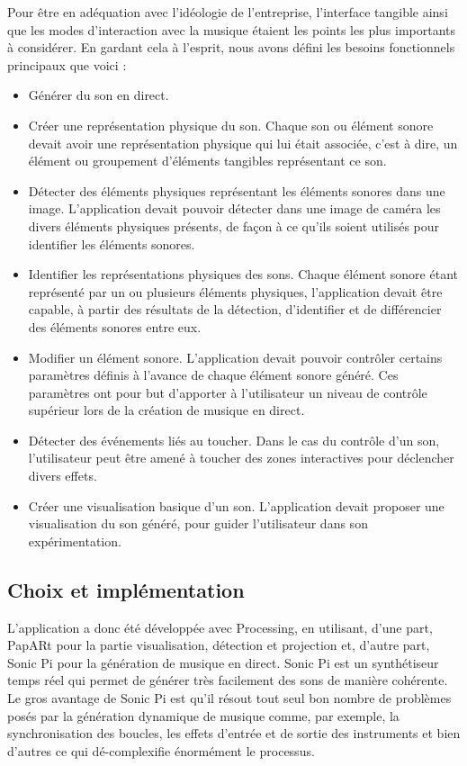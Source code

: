 Pour être en adéquation avec l'idéologie de l'entreprise, l'interface tangible ainsi que les modes d'interaction avec la musique étaient les points les plus importants à considérer. En gardant cela à l'esprit, nous avons défini les besoins fonctionnels principaux que voici :
\begin{itemize}
\item Générer du son en direct.
\item Créer une représentation physique du son. Chaque son ou élément sonore devait avoir une représentation physique qui lui était associée, c'est à dire, un élément ou groupement d'éléments tangibles représentant ce son.
\item Détecter des éléments physiques représentant les éléments sonores dans une image. L'application devait pouvoir détecter dans une image de caméra les divers éléments physiques présents, de façon à ce qu'ils soient utilisés pour identifier les éléments sonores.
\item Identifier les représentations physiques des sons. Chaque élément sonore étant représenté par un ou plusieurs éléments physiques, l'application devait être capable, à partir des résultats de la détection, d'identifier et de différencier des éléments sonores entre eux. 
\item Modifier un élément sonore. L'application devait pouvoir contrôler certains paramètres définis à l'avance de chaque élément sonore généré. Ces paramètres ont pour but d'apporter à l'utilisateur un niveau de contrôle supérieur lors de la création de musique en direct.
\item Détecter des événements liés au toucher. Dans le cas du contrôle d'un son, l'utilisateur peut être amené à toucher des zones interactives pour déclencher divers effets.
\item Créer une visualisation basique d'un son. L'application devait proposer une visualisation du son généré, pour guider l'utilisateur dans son expérimentation.
\end{itemize}

\subsection{Choix et implémentation}
\label{subsec:reartable:impl}
L'application a donc été développée avec Processing, en utilisant, d'une part, PapARt pour la partie visualisation, détection et projection et, d'autre part, Sonic Pi\cite{sonicpi} pour la génération de musique en direct.
Sonic Pi est un synthétiseur temps réel qui permet de générer très facilement des sons de manière cohérente. Le gros avantage de Sonic Pi est qu'il résout tout seul bon nombre de problèmes posés par la génération dynamique de musique comme, par exemple, la synchronisation des boucles, les effets d'entrée et de sortie des instruments et bien d'autres ce qui dé-complexifie énormément le processus.

